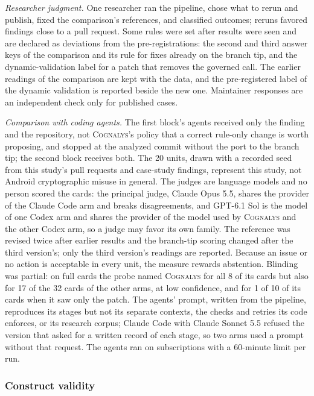 \documentclass[conference]{IEEEtran}
\newcommand{\system}{\textsc{Cognalys}}
\begin{document}
\emph{Researcher judgment.} One researcher ran the pipeline, chose what to
rerun and publish, fixed the comparison's references, and classified outcomes;
reruns favored findings close to a pull request.
Some rules were set after results were seen and are declared as deviations
from the pre-registrations: the second and third answer keys of the comparison
and its rule for fixes already on the branch tip, and the dynamic-validation
label for a patch that removes the governed call. The earlier readings of the
comparison are kept with the data, and the pre-registered label of the dynamic
validation is reported beside the new one. Maintainer responses are an
independent check only for published cases.

\emph{Comparison with coding agents.} The first block's agents received only
the finding and the repository, not \system{}'s policy that a correct
rule-only change is worth proposing, and stopped at the analyzed commit
without the port to the branch tip; the second block receives both. The 20 units, drawn with a
recorded seed from this study's pull requests and case-study findings,
represent this study, not Android cryptographic misuse in general. The
judges are language models and no person scored the cards: the principal
judge, Claude Opus 5.5, shares the provider of the Claude Code arm and breaks
disagreements, and GPT-6.1 Sol is the model of one Codex arm and shares the
provider of the model used by \system{} and the other Codex arm, so a judge may
favor its own family. The reference was revised twice after earlier results
and the branch-tip scoring changed after the third version's; only the third
version's readings are reported. Because an issue or no action is acceptable in every
unit, the measure rewards abstention. Blinding was partial: on full cards the
probe named \system{} for all 8 of its cards but also for 17 of the 32 cards of
the other arms, at low confidence, and for 1 of 10 of its cards when it saw only
the patch. The agents' prompt, written from the pipeline, reproduces its
stages but not its separate contexts, the checks and retries its code
enforces, or its research corpus; Claude Code with Claude Sonnet 5.5 refused
the version that asked for a written record of each stage, so two arms used a
prompt without that request. The agents ran on subscriptions with a 60-minute
limit per run.

\subsubsection{Construct validity}
\end{document}
